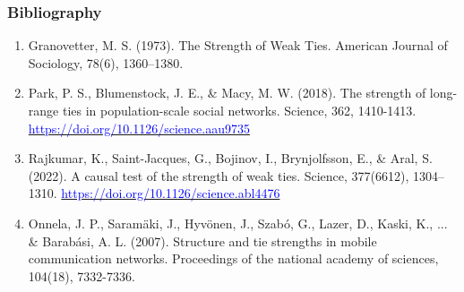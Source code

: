 \documentclass[aspectratio=169]{beamer}
\begin{document}
\begin{frame}
   \frametitle{Bibliography}
   \footnotesize
   \begin{enumerate}
      \item Granovetter, M. S. (1973). The Strength of Weak Ties. American Journal of Sociology, 78(6), 1360–1380.
      \item Park, P. S., Blumenstock, J. E., \& Macy, M. W. (2018). The strength of long-range ties in population-scale social networks. Science, 362, 1410-1413. \href{https://doi.org/10.1126/science.aau9735}{\textcolor{blue}{https://doi.org/10.1126/science.aau9735}}
      \item Rajkumar, K., Saint-Jacques, G., Bojinov, I., Brynjolfsson, E., \& Aral, S. (2022). A causal test of the strength of weak ties. Science, 377(6612), 1304–1310. \href{https://doi.org/10.1126/science.abl4476}{\textcolor{blue}{https://doi.org/10.1126/science.abl4476}}
      \item Onnela, J. P., Saramäki, J., Hyvönen, J., Szabó, G., Lazer, D., Kaski, K., ... \& Barabási, A. L. (2007). Structure and tie strengths in mobile communication networks. Proceedings of the national academy of sciences, 104(18), 7332-7336.
   \end{enumerate}
\end{frame}
\end{document}
